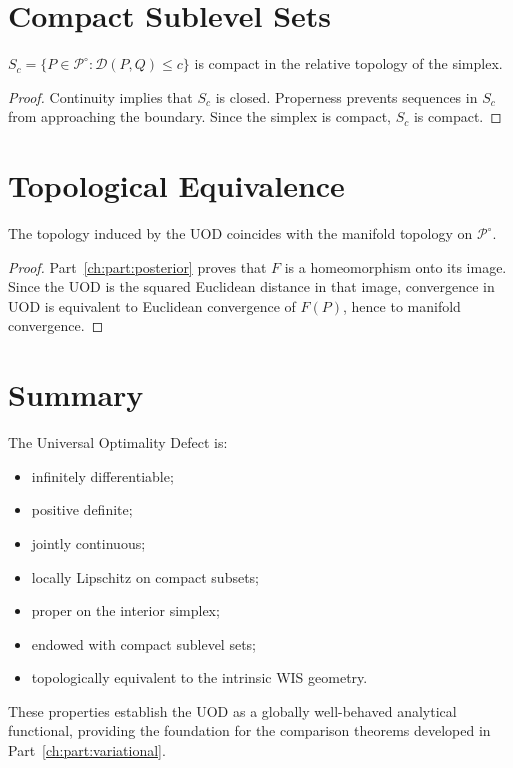 \section{Compact Sublevel Sets}\label{ch:sec:compact-sublevel-sets}
\begin{corollary}
\label{ch:cor:23-7}
$S_c=\{P\in\mathcal P^\circ:\mathcal D(P,Q)\le c\}$
is compact in the relative topology of the simplex.
\end{corollary}
\begin{proof} Continuity implies that \(S_c\) is closed. Properness prevents
sequences in \(S_c\) from approaching the boundary. Since the simplex is
compact, \(S_c\) is compact. 
\end{proof}
\section{Topological Equivalence}\label{ch:sec:topological-equivalence}
\begin{theorem}
\label{ch:thm:23-8}
The topology induced by the UOD coincides with the manifold topology on
\(\mathcal P^\circ\).
\end{theorem}
\begin{proof} Part~\ref{ch:part:posterior} proves that \(F\) is a homeomorphism onto its image.
Since the UOD is the squared Euclidean distance in that image,
convergence in UOD is equivalent to Euclidean convergence of \(F(P)\),
hence to manifold convergence. 
\end{proof}
\section{Summary}\label{ch:sec:summary}
The Universal Optimality Defect is:
\begin{itemize}
\item infinitely differentiable;
\item positive definite;
\item jointly continuous;
\item locally Lipschitz on compact subsets;
\item proper on the interior simplex;
\item endowed with compact sublevel sets;
\item topologically equivalent to the intrinsic WIS geometry.
\end{itemize}
These properties establish the UOD as a globally well-behaved analytical
functional, providing the foundation for the comparison theorems
developed in Part~\ref{ch:part:variational}.
